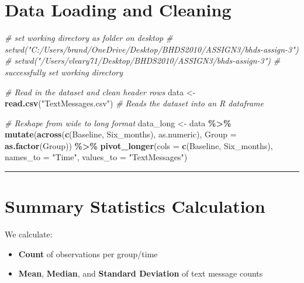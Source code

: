 \documentclass[
]{article}
\newenvironment{Shaded}{\begin{snugshade}}{\end{snugshade}}
\newcommand{\AttributeTok}[1]{\textcolor[rgb]{0.13,0.29,0.53}{#1}}
\newcommand{\CommentTok}[1]{\textcolor[rgb]{0.56,0.35,0.01}{\textit{#1}}}
\newcommand{\FunctionTok}[1]{\textcolor[rgb]{0.13,0.29,0.53}{\textbf{#1}}}
\newcommand{\NormalTok}[1]{#1}
\newcommand{\OtherTok}[1]{\textcolor[rgb]{0.56,0.35,0.01}{#1}}
\newcommand{\SpecialCharTok}[1]{\textcolor[rgb]{0.81,0.36,0.00}{\textbf{#1}}}
\newcommand{\StringTok}[1]{\textcolor[rgb]{0.31,0.60,0.02}{#1}}
\providecommand{\tightlist}{%
  \setlength{\itemsep}{0pt}\setlength{\parskip}{0pt}}
\begin{document}
\section{Data Loading and Cleaning}\label{data-loading-and-cleaning}

\begin{Shaded}
\begin{Highlighting}[]
\CommentTok{\# set working directory as folder on desktop}
\CommentTok{\# setwd("C:/Users/brand/OneDrive/Desktop/BHDS2010/ASSIGN3/bhds{-}assign{-}3")}
\CommentTok{\# setwd("/Users/vleary71/Desktop/BHDS2010/ASSIGN3/bhds{-}assign{-}3")}
\CommentTok{\# successfully set working directory}

\CommentTok{\# Read in the dataset and clean header rows}
\NormalTok{data }\OtherTok{\textless{}{-}} \FunctionTok{read.csv}\NormalTok{(}\StringTok{"TextMessages.csv"}\NormalTok{)  }\CommentTok{\# Reads the dataset into an R dataframe}

\CommentTok{\# Reshape from wide to long format}
\NormalTok{data\_long }\OtherTok{\textless{}{-}}\NormalTok{ data }\SpecialCharTok{\%\textgreater{}\%}
  \FunctionTok{mutate}\NormalTok{(}\FunctionTok{across}\NormalTok{(}\FunctionTok{c}\NormalTok{(Baseline, Six\_months), as.numeric),}
         \AttributeTok{Group =} \FunctionTok{as.factor}\NormalTok{(Group)) }\SpecialCharTok{\%\textgreater{}\%}
  \FunctionTok{pivot\_longer}\NormalTok{(}\AttributeTok{cols =} \FunctionTok{c}\NormalTok{(Baseline, Six\_months),}
               \AttributeTok{names\_to =} \StringTok{"Time"}\NormalTok{,}
               \AttributeTok{values\_to =} \StringTok{"TextMessages"}\NormalTok{)}
\end{Highlighting}
\end{Shaded}

\begin{center}\rule{0.5\linewidth}{0.5pt}\end{center}

\section{Summary Statistics
Calculation}\label{summary-statistics-calculation}

We calculate:

\begin{itemize}
\tightlist
\item
  \textbf{Count} of observations per group/time
\item
  \textbf{Mean}, \textbf{Median}, and \textbf{Standard Deviation} of
  text message counts
\end{itemize}
\end{document}
